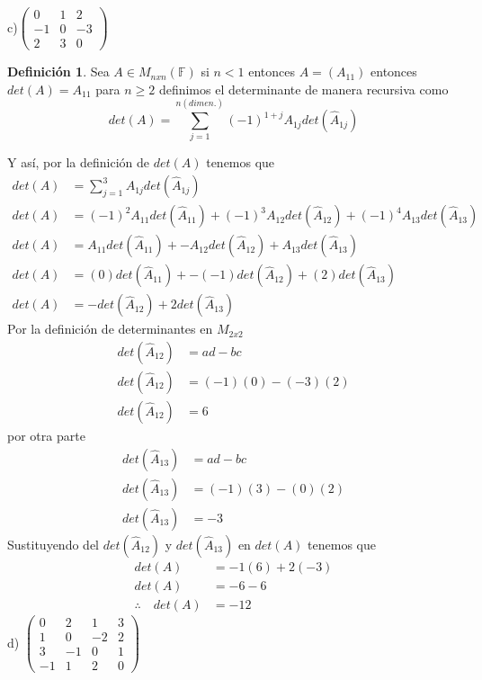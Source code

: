 \documentclass[letterpaper]{article}
\newcommand{\F}{\mathds{F}}
\renewcommand{\*}{\cdot}
\theoremstyle{definition}
\newtheorem{definition}{Definición}
\begin{document}
	c)$\begin{pmatrix} 0 & 1 & 2 \\ -1 & 0 & -3 \\ 2 & 3 & 0 \end{pmatrix}$\\
	\begin{definition}
		Sea $ A \in M_{nxn}(\F) $  si $ n < 1 $ entonces $ A = (A_{11}) $ entonces $ det(A) = A_{11} $ para $ n\geq 2 $ definimos el determinante de manera recursiva como
		\[ det(A) = \sum_{j = 1}^{n (dimen.)} (-1)^{1 + j} A_{1j}det(\hat{A}_{1j}) \]
	\end{definition}
	Y así, por la definición de $ det(A) $ tenemos que 
	\begin{align*}
		det(A) &= \sum_{j = 1}^{3} A_{1j} det(\hat{A}_{1j}) \\
		det(A) &= (-1)^2 A_{11} det(\hat{A}_{11}) + (-1)^3 A_{12} det(\hat{A}_{12}) + (-1)^4 A_{13} det(\hat{A}_{13}) \\
		det(A) &= A_{11} det(\hat{A}_{11}) + -A_{12} det(\hat{A}_{12}) + A_{13} det(\hat{A}_{13}) \\
		det(A) &= (0)det(\hat{A}_{11}) + -(-1) det(\hat{A}_{12}) + (2) det(\hat{A}_{13}) \\
		det(A) &= -det(\hat{A}_{12}) + 2det(\hat{A}_{13}) 
	\end{align*}
	Por la definición de determinantes en $ M_{2x2} $
	\begin{align*}
		det(\hat{A}_{12}) &= ad -bc\\
		det(\hat{A}_{12}) &= (-1)(0)-(-3)(2)\\
		det(\hat{A}_{12}) &= 6
	\end{align*}
	por otra parte
	\begin{align*}
		det(\hat{A}_{13}) &= ad -bc \\
		det(\hat{A}_{13}) &= (-1)(3) - (0)(2) \\
		det(\hat{A}_{13}) &= -3 
	\end{align*}
	Sustituyendo del $ det(\hat{A}_{12}) $ y $ det(\hat{A}_{13}) $ en $ det(A) $ tenemos que 
	\begin{align*}
		det(A) &= -1(6) +2(-3)\\
		det(A) &= -6 -6\\
		\therefore \quad det(A) &= -12
	\end{align*}
	d) $\begin{pmatrix} 0 & 2 & 1 & 3 \\ 1 & 0 & -2 & 2 \\ 3 & -1 & 0 & 1 \\ -1 & 1 & 2 & 0 \end{pmatrix}$\\
\end{document}
